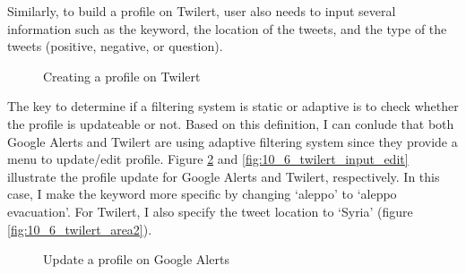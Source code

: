 \documentclass[letterpaper,11pt]{article}
\begin{document}
Similarly, to build a profile on Twilert, user also needs to input several information such as the keyword, the location of the tweets, and the type of the tweets (positive, negative, or question). 

\begin{figure}[H]
	\centering
	\caption{Creating a profile on Twilert}
	\label{fig:10_6_twilert_input}
\end{figure}

The key to determine if a filtering system is static or adaptive is to check whether the profile is updateable or not. Based on this definition, I can conlude that both Google Alerts and Twilert are using adaptive filtering system since they provide a menu to update/edit profile. Figure \ref{fig:10_6_google_alert_edit} and \ref{fig:10_6_twilert_input_edit} illustrate the profile update for Google Alerts and Twilert, respectively. In this case, I make the keyword more specific by changing `aleppo' to `aleppo evacuation'. For Twilert, I also specify the tweet location to `Syria' (figure \ref{fig:10_6_twilert_area2}).

\begin{figure}[H]
	\centering
	\caption{Update a profile on Google Alerts}
	\label{fig:10_6_google_alert_edit}
\end{figure}
\end{document}
